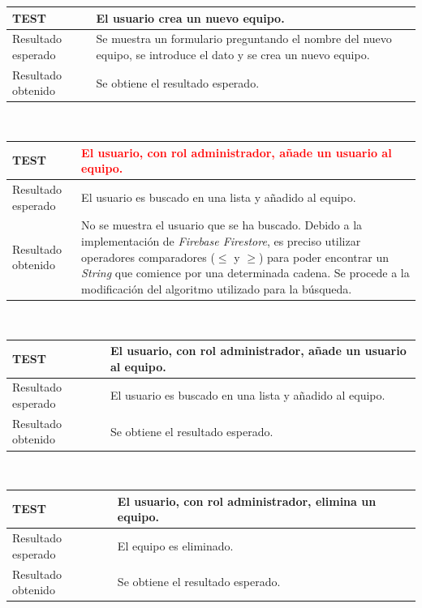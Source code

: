 \documentclass[twoside]{report}
\newcommand\addrow[2]{#1 &#2\\ }
\newcommand\addheading[2]{#1 &#2\\ \hline}
\newcommand\tabularhead{\begin{tabular}{lp{0.7\textwidth}}
\hline
}
\newenvironment{test}{\tabularhead}
{\hline\end{tabular}}
\begin{document}
\vspace{0.5cm}

\begin{test}
  \addheading{\textbf{TEST\arabic{test}}}{El usuario crea un nuevo equipo.} 
  \addrow{Resultado esperado}{Se muestra un formulario preguntando el nombre del nuevo equipo, se introduce el dato y se crea un nuevo equipo.}
  \addrow{Resultado obtenido}{Se obtiene el resultado esperado.}
\end{test}\\

\vspace{0.5cm}

\begin{test}
 \addheading{\textbf{TEST\arabic{test}}}{\textcolor{red}{El usuario, con rol administrador, añade un usuario al equipo.}}
 \addrow{Resultado esperado}{El usuario es buscado en una lista y añadido al equipo.}
 \addrow{Resultado obtenido}{No se muestra el usuario que se ha buscado. Debido a la implementación de \textit{Firebase Firestore}, es preciso utilizar operadores comparadores ($\leqslant$ y $\geqslant$) para poder encontrar un \textit{String} que comience por una determinada cadena. Se procede a la modificación del algoritmo utilizado para la búsqueda.}
\end{test}\\

\vspace{0.5cm}

\begin{test}
 \addheading{\textbf{TEST\arabic{test}}}{El usuario, con rol administrador, añade un usuario al equipo.}
 \addrow{Resultado esperado}{El usuario es buscado en una lista y añadido al equipo.}
  \addrow{Resultado obtenido}{Se obtiene el resultado esperado.}
\end{test}\\

\vspace{0.5cm}

\begin{test}
 \addheading{\textbf{TEST\arabic{test}}}{El usuario, con rol administrador, elimina un equipo.}
 \addrow{Resultado esperado}{El equipo es eliminado.}
 \addrow{Resultado obtenido}{Se obtiene el resultado esperado.}
\end{test}\\

\vspace{0.5cm}
\end{document}
